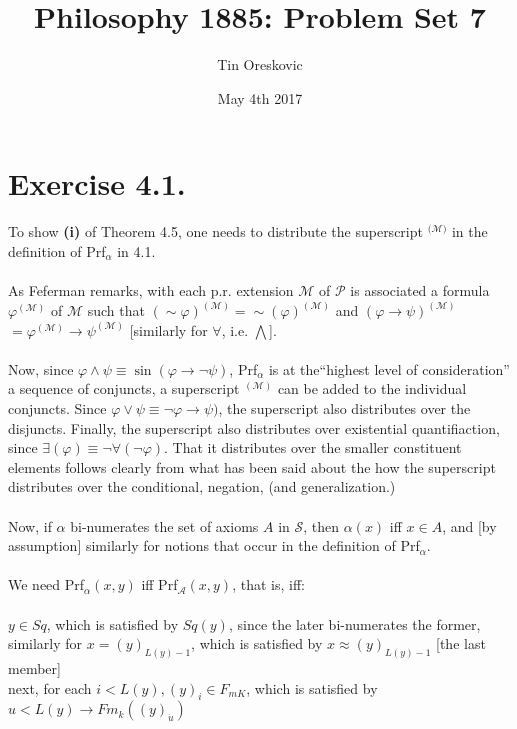 \documentclass{article}
\title{Philosophy 1885: Problem Set 7}
\author{Tin Oreskovic}
\date{May 4th 2017}
\begin{document}
\maketitle
\section*{Exercise 4.1.}
To show \textbf{(i)} of Theorem 4.5, one needs to distribute the superscript $^{\mathscr{(M})}$ in the definition of Prf$_\alpha$ in 4.1.\\\\
As Feferman remarks, with each p.r. extension
$\mathscr{M}$ of $\mathscr{P}$ is associated a formula $\varphi^{\mathscr{(M)}}$ of $\mathscr{M}$ such that $(\sim\varphi)^{\mathscr{(M)}} = \sim(\varphi)^{\mathscr{(M)}}$ and $(\varphi \rightarrow \psi)^{\mathscr{(M)}}$ $= \varphi^{\mathscr{(M)}} \rightarrow \psi^{\mathscr{(M)}}$ [similarly for $\forall$, i.e. $\bigwedge$].\\\\
Now, since $\varphi \wedge \psi \equiv \sin (\varphi \rightarrow \neg \psi)$, Prf$_\alpha$ is at the``highest level of consideration'' a sequence of conjuncts, a superscript $^{\mathscr{(M)}}$ can be added to the individual conjuncts. Since $\varphi \vee \psi \equiv \neg \varphi \rightarrow \psi)$, the superscript also distributes over the disjuncts. Finally, the superscript also distributes over existential quantifiaction, since $\exists (\varphi) \equiv \neg\forall(\neg\varphi)$.  That it distributes over the smaller constituent elements follows clearly from what has been said about the how the superscript distributes over the conditional, negation, (and generalization.)\\\\
Now, if $\alpha$ bi-numerates the set of axioms $A$ in $\mathscr{S}$, then $\alpha(x)$ iff $x \in A$, and [by assumption] similarly for notions that occur in the definition of Prf$_\alpha$.\\\\
We need Prf$_\alpha(x, y)$ iff Prf$_{\mathscr{A}}(x, y)$, that is, iff:\\\\
$y \in Sq$, which is satisfied by $Sq(y)$, since the later bi-numerates the former,\\
similarly for $x = (y)_{L(y)-1}$, which is satisfied by $x \approx (y) _{L(y)-1}$ [the last member]\\
next, for each $i < L(y), (y)_{i} \in F_{mK}$, which is satisfied by $u<L(y) \rightarrow Fm_{k}((y)_{\dot{u}})$\\
\end{document}
